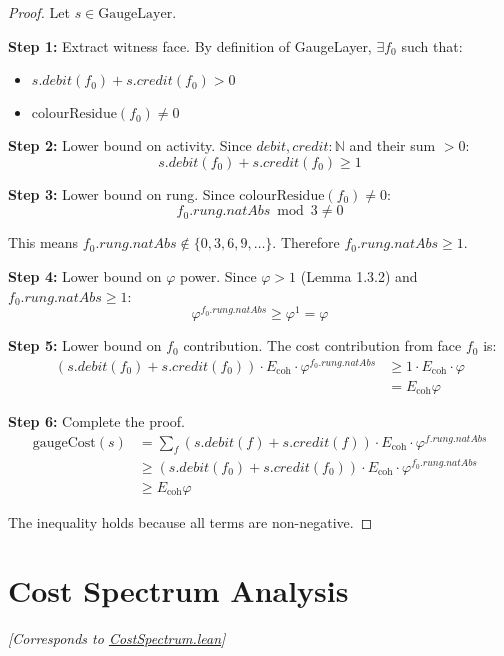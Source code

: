 \documentclass[11pt]{article}
\numberwithin{equation}{section}
\theoremstyle{remark}
\newcommand{\Ecoh}{E_{\text{coh}}}
\newcommand{\N}{\mathbb{N}}
\begin{document}
\begin{proof}
Let $s \in \text{GaugeLayer}$.

\textbf{Step 1:} Extract witness face.
By definition of GaugeLayer, $\exists f_0$ such that:
\begin{itemize}
\item $s.debit(f_0) + s.credit(f_0) > 0$
\item $\text{colourResidue}(f_0) \neq 0$
\end{itemize}

\textbf{Step 2:} Lower bound on activity.
Since $debit, credit : \N$ and their sum $> 0$:
\[s.debit(f_0) + s.credit(f_0) \geq 1\]

\textbf{Step 3:} Lower bound on rung.
Since $\text{colourResidue}(f_0) \neq 0$:
\[f_0.rung.natAbs \bmod 3 \neq 0\]

This means $f_0.rung.natAbs \notin \{0, 3, 6, 9, \ldots\}$.
Therefore $f_0.rung.natAbs \geq 1$.

\textbf{Step 4:} Lower bound on $\varphi$ power.
Since $\varphi > 1$ (Lemma 1.3.2) and $f_0.rung.natAbs \geq 1$:
\[\varphi^{f_0.rung.natAbs} \geq \varphi^1 = \varphi\]

\textbf{Step 5:} Lower bound on $f_0$ contribution.
The cost contribution from face $f_0$ is:
\begin{align}
(s.debit(f_0) + s.credit(f_0)) \cdot \Ecoh \cdot \varphi^{f_0.rung.natAbs} 
&\geq 1 \cdot \Ecoh \cdot \varphi\\
&= \Ecoh \varphi
\end{align}

\textbf{Step 6:} Complete the proof.
\begin{align}
\text{gaugeCost}(s) &= \sum_f (s.debit(f) + s.credit(f)) \cdot \Ecoh \cdot \varphi^{f.rung.natAbs}\\
&\geq (s.debit(f_0) + s.credit(f_0)) \cdot \Ecoh \cdot \varphi^{f_0.rung.natAbs}\\
&\geq \Ecoh \varphi
\end{align}

The inequality holds because all terms are non-negative.
\end{proof}

\section{Cost Spectrum Analysis}
\textit{[Corresponds to \href{https://github.com/jonwashburn/Yang-Mills-Lean/blob/main/YangMillsProof/CostSpectrum.lean}{CostSpectrum.lean}]}
\end{document}
